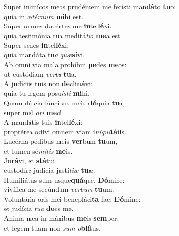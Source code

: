 \evenverse Super inimícos meos prudéntem me fecísti man\textbf{dá}to \textbf{tu}o:~\*\\
\evenverse quia in æ\textit{tér}\textit{num} \textbf{mi}hi est.\\
\oddverse Super omnes docéntes me \textbf{in}tel\textbf{lé}xi:~\*\\
\oddverse quia testimónia tua meditá\textit{ti}\textit{o} \textbf{me}a est.\\
\evenverse Super senes \textbf{in}tel\textbf{lé}xi:~\*\\
\evenverse quia mandáta tu\textit{a} \textit{quæ}\textbf{sí}vi.\\
\oddverse Ab omni via mala prohíbui \textbf{pe}des \textbf{me}os:~\*\\
\oddverse ut custódiam \textit{ver}\textit{ba} \textbf{tu}a.\\
\evenverse A judíciis tuis non \textbf{de}cli\textbf{ná}vi:~\*\\
\evenverse quia tu legem posu\textit{í}\textit{sti} \textbf{mi}hi.\\
\oddverse Quam dúlcia fáucibus meis e\textbf{ló}quia \textbf{tu}a,~\*\\
\oddverse super mel \textit{o}\textit{ri} \textbf{me}o!\\
\evenverse A mandátis tuis \textbf{in}tel\textbf{lé}xi:~\*\\
\evenverse proptérea odívi omnem viam i\textit{ni}\textit{qui}\textbf{tá}tis.\\
\oddverse Lucérna pédibus meis \textbf{ver}bum \textbf{tu}um,~\*\\
\oddverse et lumen sé\textit{mi}\textit{tis} \textbf{me}is.\\
\evenverse Ju\textbf{rá}vi, et \textbf{stá}tui~\*\\
\evenverse custodíre judícia justí\textit{ti}\textit{æ} \textbf{tu}æ.\\
\oddverse Humiliátus sum usque\textbf{quá}que, \textbf{Dó}mine:~\*\\
\oddverse vivífica me secúndum \textit{ver}\textit{bum} \textbf{tu}um.\\
\evenverse Voluntária oris mei benepláci\textbf{ta} fac, \textbf{Dó}mine:~\*\\
\evenverse et judícia \textit{tu}\textit{a} \textbf{do}ce me.\\
\oddverse Anima mea in mánibus \textbf{me}is \textbf{sem}per:~\*\\
\oddverse et legem tuam non \textit{sum} \textit{o}\textbf{blí}tus.\\
